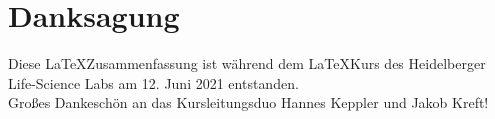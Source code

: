 \section{Danksagung}
Diese \LaTeX Zusammenfassung ist während dem \LaTeX Kurs des Heidelberger Life-Science Labs am 12. Juni 2021 entstanden.\\
Großes Dankeschön an das Kursleitungsduo Hannes Keppler und Jakob Kreft!
